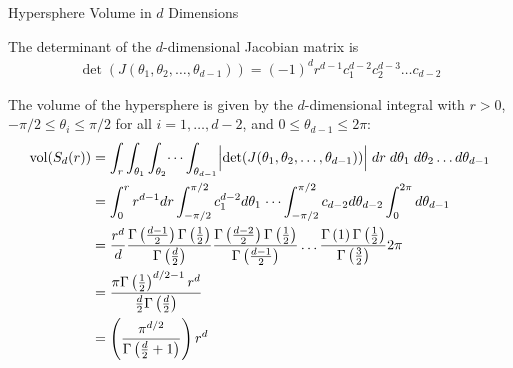 \begin{frame}{Hypersphere Volume in $d$ Dimensions}
  \small

The determinant of the 
$d$-dimensional Jacobian matrix is
\begin{align*}
    \det(J(\theta_1,\theta_2,\dots,\theta_{d-1})) =
    (-1)^d r^{d-1} c_1^{d-2} c_2^{d-3} \dots c_{d-2}
\end{align*}

\medskip
The volume of the hypersphere is given by the $d$-dimensional
integral with
$r > 0$, $-\pi/2 \le \theta_i \le \pi/2$ for all $i=1,
\dots, d-2$, and $0 \le \theta_{d-1} \le 2\pi$:
\begin{align*}
    \vol(S_d(r)) & =
    \int_r \int_{\theta_1} \int_{\theta_2} \dots
    \int_{\theta_{d-1}}
    \Bigl|\det(J(\theta_1,\theta_2,\dots,\theta_{d-1}))\Bigr| \; dr \;
    d{\theta_1} \; d{\theta_2} \dots d{\theta_{d-1}}\nonumber\\
    & = \int_0^r r^{d-1} dr
    \int_{-\pi/2}^{\pi/2} c_1^{d-2} d\theta_1 \;
    \dots
    \int_{-\pi/2}^{\pi/2} c_{d-2} d\theta_{d-2}
    \int_0^{2\pi} d\theta_{d-1}\\
	& = 
     {r^d \over d}
    \frac{\Gamma\lB(\frac{d-1}{2}\rB)\Gamma\lB({1\over 2}\rB)}
           {\Gamma\lB(\frac{d}{2}\rB)}
    \frac{\Gamma\lB(\frac{d-2}{2}\rB)\Gamma\lB({1\over 2}\rB)}
           {\Gamma\lB(\frac{d-1}{2}\rB)}
    \dots
    \frac{\Gamma\lB(1\rB)\Gamma\lB({1\over 2}\rB)}
           {\Gamma\lB(\frac{3}{2}\rB)}
    2\pi\nonumber\\
    & = \frac{\pi \Gamma\lB({\frac{1}{2}}\rB)^{d/2-1} r^d}
        {\frac{d}{2}\Gamma\lB(\frac{d}{2}\rB)}\nonumber\\
        & = \lB(\frac{\pi^{d/2}}{\Gamma\lB(\frac{d}{2}+1\rB)}
        \rB) r^d
\end{align*}
\end{frame}
